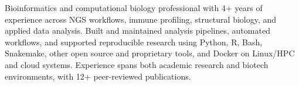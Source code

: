 \documentclass[11pt,letterpaper,withhyper]{altacv}
\begin{document}


\makecvheader

\vspace{0.8em}

{\justifying
Bioinformatics and computational biology professional with 4+ years of experience across NGS workflows, immune profiling, structural biology, and applied data analysis. Built and maintained analysis pipelines, automated workflows, and supported reproducible research using Python, R, Bash, Snakemake, other open source and proprietary tools, and Docker on Linux/HPC and cloud systems. Experience spans both academic research and biotech environments, with 12+ peer-reviewed publications.\par}
\vspace{0.5em}

\end{document}
